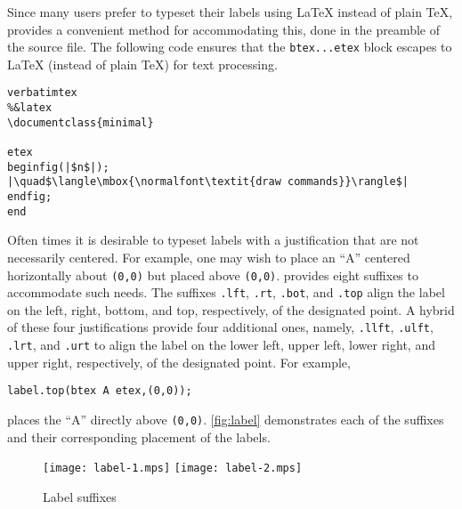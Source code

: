 Since many \MP{} users prefer to typeset their labels using \LaTeX{}
instead of plain \TeX, \MP{} provides a convenient method for
accommodating this, done in the preamble of the \MP{} source file.  The
following code ensures that the \verb|btex...etex| block escapes to
\LaTeX{} (instead of plain \TeX) for text processing.

\begin{lstlisting}[xleftmargin=56bp]
verbatimtex
%&latex
\documentclass{minimal}

etex
beginfig(|$n$|);
|\quad$\langle\mbox{\normalfont\textit{draw commands}}\rangle$|
endfig;
end
\end{lstlisting}

Often times it is desirable to typeset labels with a justification that
are not necessarily centered.  For example, one may wish to place an
``A'' centered horizontally about \texttt{(0,0)} but placed above
\texttt{(0,0)}. \MP{} provides eight suffixes to accommodate such needs.
The suffixes \texttt{.lft}, \texttt{.rt}, \texttt{.bot}, and
\texttt{.top} align the label on the left, right, bottom, and top,
respectively, of the designated point.  A hybrid of these four
justifications provide four additional ones, namely, \texttt{.llft},
\texttt{.ulft}, \texttt{.lrt}, and \texttt{.urt} to align the label on
the lower left, upper left, lower right, and upper right, respectively,
of the designated point.  For example,

\begin{center}
  \verb|label.top(btex A etex,(0,0));|
\end{center}
places the ``A'' directly above \texttt{(0,0)}.  \autoref{fig:label}
demonstrates each of the suffixes and their corresponding placement of
the labels.

\begin{figure}
  \hfill%
  \texttt{[image: label-1.mps]}
  \hfill%
  \texttt{[image: label-2.mps]}
  \hfill\mbox{}
  \caption{Label suffixes}
  \label{fig:label}
\end{figure}
